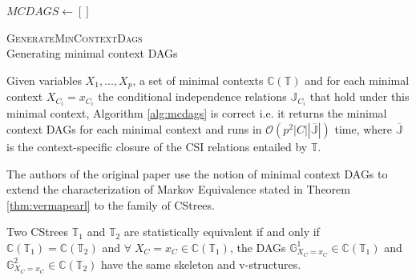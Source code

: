\documentclass{tufte-book}
\begin{document}
\begin{algorithm}\label{alg:mcdags}
\SetAlgoLined
{}
$MCDAGS \gets []$\;

\caption{\textsc{GenerateMinContextDags} \\ Generating minimal context DAGs}
\end{algorithm}

 \newpage 

\begin{theorem}\label{thm:mcdagscorrectness}
Given variables $X_1,...,X_p$, a set of minimal contexts $\mathbb{C}(\mathbb{T})$ and for each minimal context $X_{C_i}=x_{C_i}$ the conditional independence relations $\mathbb{J}_{C_i}$ that hold under this minimal context, Algorithm \ref{alg:mcdags} is correct i.e. it returns the minimal context DAGs for each minimal context and runs in $\mathcal{O}(p^2 |C||\mathbb{\overline{J}}|)$ time, where $\mathbb{\overline{J}}$ is the context-specific closure of the CSI relations entailed by $\mathbb{T}$.
\end{theorem}



The authors of the original paper \cite{duarte-2021-repres-contex} use the notion of minimal context DAGs to extend the characterization of Markov Equivalence stated in Theorem \ref{thm:vermapearl} to the family of CStrees.

\begin{theorem}\label{thm:vermapearlgeneralized}
Two CStrees $\mathbb{T}_1$ and $\mathbb{T}_2$ are statistically equivalent if and only if $\mathbb{C}(\mathbb{T}_1) = \mathbb{C}(\mathbb{T}_2)$ and $\forall \; X_C=x_C \in \mathbb{C}(\mathbb{T}_1)$, the DAGs $\mathbb{G}^1_{X_C=x_C} \in \mathbb{C}(\mathbb{T}_1)$ and $\mathbb{G}^2_{X_C=x_C} \in \mathbb{C}(\mathbb{T}_2)$ have the same skeleton and v-structures. 
\end{theorem}
\end{document}
